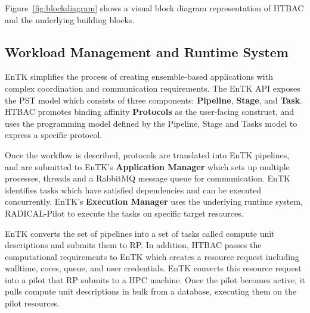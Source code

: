 Figure~\ref{fig:blockdiagram} shows a visual block diagram representation of 
HTBAC and the underlying building blocks. 

\subsection{Workload Management and Runtime System}

EnTK simplifies the process of creating ensemble-based applications with
complex coordination and communication requirements. The EnTK API exposes the
PST model which consists of three components: \textbf{Pipeline},
\textbf{Stage}, and \textbf{Task}. HTBAC promotes binding affinity {\bf
Protocols} as the user-facing construct, and uses the programming model
defined by the Pipeline, Stage and Tasks model to express a specific
protocol. 





Once the workflow is described, protocols are translated into EnTK pipelines, and 
are submitted to EnTK's \textbf{Application Manager} which sets up multiple 
processes, threads and a RabbitMQ message queue for communication.
EnTK identifies tasks which have satisfied dependencies and can be executed
concurrently. EnTK's \textbf{Execution Manager} uses the underlying runtime
system, RADICAL-Pilot to execute the tasks on specific target resources.

EnTK converts the set of pipelines into a set of tasks called compute unit 
descriptions and submits them to RP. In addition, HTBAC passes the computational
requirements to EnTK which creates a resource request including walltime, cores, 
queue, and user credentials. EnTK converts this resource request into a pilot 
that RP submits to a HPC machine. Once the pilot becomes active, it pulls 
compute unit descriptions in bulk from a database, executing them on the pilot 
resources. 

